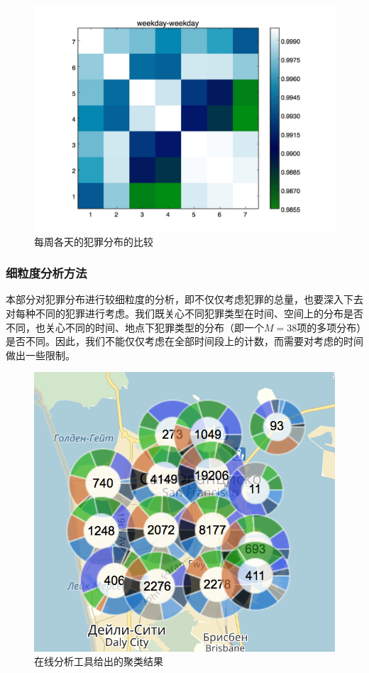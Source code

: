 \begin{figure}[H]
    \centering
    \includegraphics[width=1.0\linewidth]{fig/weekday_corr}
    \caption{每周各天的犯罪分布的比较}
    \label{fig:weekday_corr}
\end{figure}

\subsubsection{细粒度分析方法}

本部分对犯罪分布进行较细粒度的分析，即不仅仅考虑犯罪的总量，也要深入下去对每种不同的犯罪进行考虑。我们既关心不同犯罪类型在时间、空间上的分布是否不同，也关心不同的时间、地点下犯罪类型的分布（即一个$M=38$项的多项分布）是否不同。因此，我们不能仅仅考虑在全部时间段上的计数，而需要对考虑的时间做出一些限制。

\begin{figure}[H]
    \centering
    \includegraphics[width=1.0\linewidth]{fig/online_tool}
    \caption{在线分析工具给出的聚类结果}
    \label{fig:online_tool}
\end{figure}

